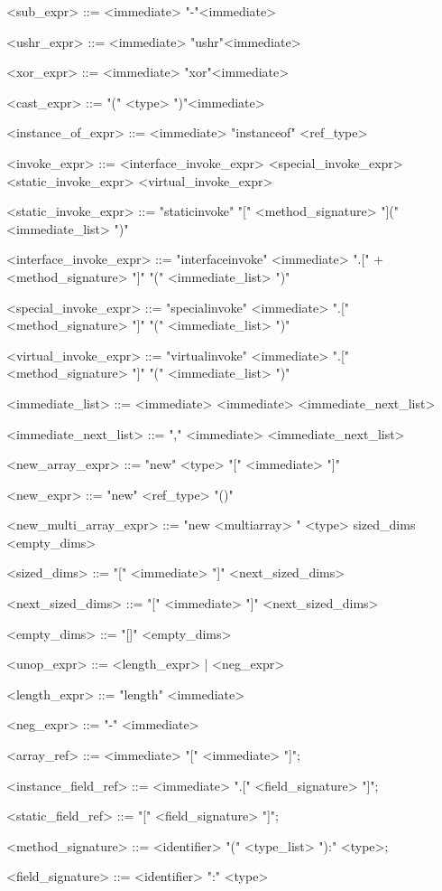 \documentclass{report}
\begin{document}
\begin{grammar}
<sub_expr> ::= <immediate> "-"<immediate>

<ushr_expr> ::= <immediate> "ushr"<immediate>

<xor_expr> ::= <immediate> "xor"<immediate>

<cast_expr> ::= "(" <type> ")"<immediate>

<instance_of_expr> ::= <immediate> "instanceof" <ref_type>

<invoke_expr> ::= <interface_invoke_expr> \alt <special_invoke_expr> \alt <static_invoke_expr> <virtual_invoke_expr>

<static_invoke_expr> ::= "staticinvoke" "[" <method_signature> "](" <immediate_list> ")"

<interface_invoke_expr> ::= "interfaceinvoke" <immediate> ".[" + <method_signature> "]" "(" <immediate_list> ")"

<special_invoke_expr> ::= "specialinvoke" <immediate> ".[" <method_signature> "]" "(" <immediate_list> ")"

<virtual_invoke_expr> ::= "virtualinvoke" <immediate> ".[" <method_signature> "]" "(" <immediate_list> ")"

<immediate_list> ::= <immediate> \alt <immediate> <immediate_next_list>

<immediate_next_list> ::= "," <immediate> <immediate_next_list>

<new_array_expr> ::= "new" <type> "[" <immediate> "]"

<new_expr> ::= "new" <ref_type> "()"

<new_multi_array_expr> ::= "new <multiarray> " <type> sized_dims <empty_dims>

<sized_dims> ::= "[" <immediate> "]" <next_sized_dims>

<next_sized_dims> ::= "[" <immediate> "]" <next_sized_dims>

<empty_dims> ::= "[]" <empty_dims> 

<unop_expr> ::= <length_expr> | <neg_expr>

<length_expr> ::= "length" <immediate>

<neg_expr> ::= "-" <immediate>

<array_ref> ::= <immediate> "[" <immediate> "]";

<instance_field_ref> ::= <immediate> ".[" <field_signature> "]";

<static_field_ref> ::= "[" <field_signature> "]";

<method_signature> ::= <identifier> "(" <type_list> "):" <type>;

<field_signature> ::= <identifier> ":" <type>


\end{grammar}
\end{document}
